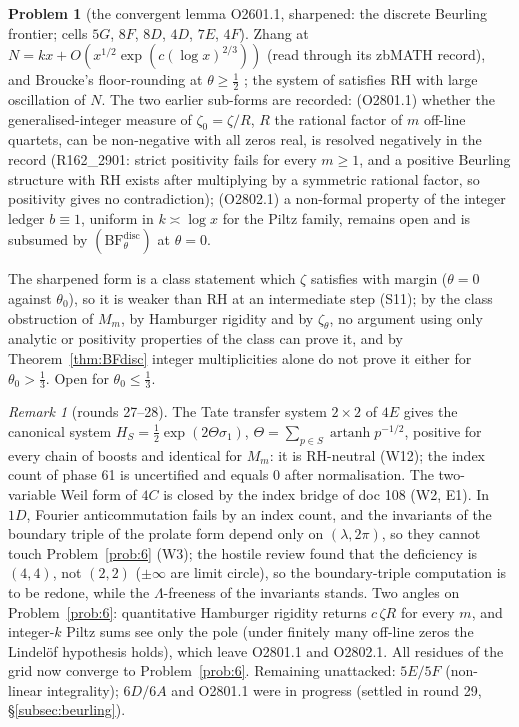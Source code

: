 \documentclass[11pt]{amsart}
\theoremstyle{definition}
\newtheorem{problem}{Problem}
\theoremstyle{remark}
\newtheorem{remark}[theorem]{Remark}
\begin{document}
\begin{problem}[the convergent lemma O2601.1, sharpened: the discrete Beurling frontier; cells $5G$, $8F$, $8D$, $4D$, $7E$, $4F$]
Zhang at $N=kx+O(x^{1/2}\exp(c(\log x)^{2/3}))$ \cite{Zhang2007} (read through its zbMATH record), and Broucke's
floor-rounding at $\theta\ge\frac12$ \cite[Thm.~6.3]{Broucke2024}; the system of \cite{BDV2020} satisfies RH with
large oscillation of $N$. The two earlier sub-forms are recorded: (O2801.1) whether the generalised-integer measure of
$\zeta_0=\zeta/R$, $R$ the rational factor of $m$ off-line quartets, can be non-negative with all zeros real, is
resolved negatively in the record (R162\_2901: strict positivity fails for every $m\ge1$, and a positive Beurling
structure with RH exists after multiplying by a symmetric rational factor, so positivity gives no contradiction);
(O2802.1) a non-formal property of the integer ledger $b\equiv1$, uniform in $k\asymp\log x$ for the Piltz family,
remains open and is subsumed by $(\mathrm{BF}^{\mathrm{disc}}_\theta)$ at $\theta=0$.
\end{problem}
\noindent The sharpened form is a class statement which $\zeta$ satisfies with margin ($\theta=0$ against
$\theta_0$), so it is weaker than RH at an intermediate step (S11); by the class obstruction of $M_m$, by
Hamburger rigidity and by $\zeta_\theta$, no argument using only analytic or positivity properties of the class can
prove it, and by Theorem~\ref{thm:BFdisc} integer multiplicities alone do not prove it either for $\theta_0>\frac13$. Open for $\theta_0\le\frac13$.

\begin{remark}[rounds 27--28]\label{rem:r2728}
The Tate transfer system $2\times2$ of $4E$ gives the canonical system $H_S=\frac12\exp(2\Theta\sigma_1)$,
$\Theta=\sum_{p\in S}\operatorname{artanh}p^{-1/2}$, positive for every chain of boosts and identical for $M_m$: it is
RH-neutral (W12); the index count of phase 61 is uncertified and equals $0$ after normalisation. The
two-variable Weil form of $4C$ is closed by the index bridge of doc 108 (W2, E1). In $1D$, Fourier
anticommutation fails by an index count, and the invariants of the boundary triple of the prolate form depend
only on $(\lambda,2\pi)$, so they cannot touch Problem~\ref{prob:6} (W3); the hostile review found that the
deficiency is $(4,4)$, not $(2,2)$ ($\pm\infty$ are limit circle), so the boundary-triple computation is to be
redone, while the $\Lambda$-freeness of the invariants stands. Two angles on Problem~\ref{prob:6}: quantitative
Hamburger rigidity returns $c\,\zeta R$ for every $m$, and integer-$k$ Piltz sums see only the pole (under finitely
many off-line zeros the Lindel\"of hypothesis holds), which leave O2801.1 and O2802.1. All residues of the grid now
converge to Problem~\ref{prob:6}. Remaining unattacked: $5E/5F$ (non-linear integrality); $6D/6A$ and O2801.1 were
in progress (settled in round 29, \S\ref{subsec:beurling}).
\end{remark}
\end{document}
